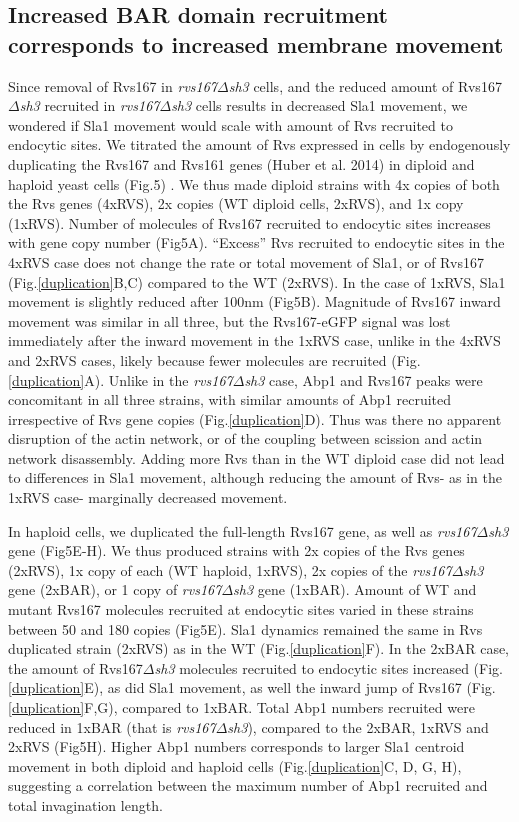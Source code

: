 \documentclass[9pt,lineno]{elife}
\begin{document}
\subsection{Increased BAR domain recruitment corresponds to increased membrane movement}
Since removal of Rvs167 in \textit{rvs167$\Delta$sh3}  cells, and the reduced amount of Rvs167\textit{$\Delta$sh3}  recruited in \textit{rvs167$\Delta$sh3} cells results in decreased Sla1 movement, we wondered if Sla1 movement would scale with amount of Rvs recruited to endocytic sites. We titrated the amount of Rvs expressed in cells by endogenously duplicating the Rvs167 and Rvs161 genes (Huber et al. 2014) in diploid and haploid yeast cells (Fig.5) . We thus made diploid strains with 4x copies of both the Rvs genes (4xRVS), 2x copies (WT diploid cells, 2xRVS), and 1x copy (1xRVS). Number of molecules of Rvs167 recruited to endocytic sites increases with gene copy number (Fig5A). “Excess” Rvs recruited to endocytic sites in the 4xRVS case does not change the rate or total movement of Sla1, or of Rvs167 (Fig.\ref{duplication}B,C) compared to the WT (2xRVS). In the case of 1xRVS, Sla1 movement is slightly reduced after 100nm (Fig5B). Magnitude of Rvs167 inward movement was similar in all three, but the Rvs167-eGFP signal was lost immediately after the inward movement in the 1xRVS case, unlike in the 4xRVS and 2xRVS cases, likely because fewer molecules are recruited (Fig.\ref{duplication}A). Unlike in the \textit{rvs167$\Delta$sh3}  case, Abp1 and Rvs167 peaks were concomitant in all three strains, with similar amounts of Abp1 recruited irrespective of Rvs gene copies (Fig.\ref{duplication}D). Thus was there no apparent disruption of the actin network, or of the coupling between scission and actin network disassembly. Adding more Rvs than in the WT diploid case did not lead to differences in Sla1 movement, although reducing the amount of Rvs- as in the 1xRVS case- marginally decreased movement. 

In haploid cells, we duplicated the full-length Rvs167 gene, as well as \textit{rvs167$\Delta$sh3} gene (Fig5E-H). We thus produced strains with 2x copies of the Rvs genes (2xRVS), 1x copy of each (WT haploid, 1xRVS), 2x copies of the \textit{rvs167$\Delta$sh3} gene (2xBAR), or 1 copy of \textit{rvs167$\Delta$sh3} gene (1xBAR). Amount of WT and mutant Rvs167 molecules recruited at endocytic sites varied in these strains between 50 and 180 copies (Fig5E). Sla1 dynamics remained the same in Rvs duplicated strain (2xRVS) as in the WT (Fig.\ref{duplication}F). In the 2xBAR case, the amount of Rvs167\textit{$\Delta$sh3}  molecules  recruited to endocytic sites increased (Fig.\ref{duplication}E), as did Sla1 movement, as well the inward jump of Rvs167 (Fig.\ref{duplication}F,G), compared to 1xBAR. Total Abp1 numbers recruited were reduced in 1xBAR (that is \textit{rvs167$\Delta$sh3}), compared to the 2xBAR, 1xRVS and 2xRVS (Fig5H). Higher Abp1 numbers corresponds to larger Sla1 centroid movement in both diploid and haploid cells (Fig.\ref{duplication}C, D, G, H), suggesting a correlation between the maximum number of Abp1 recruited and total invagination length.
\end{document}
